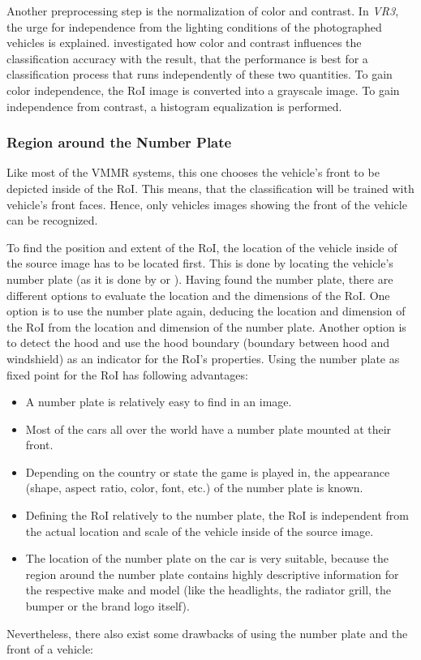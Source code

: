 Another preprocessing step is the normalization of color and contrast. In \emph{VR3}, the urge for independence from the lighting conditions of the photographed vehicles is explained. \citeauthor{petrovic2004analysis} investigated how color and contrast influences the classification accuracy with the result, that the performance is best for a classification process that runs independently of these two quantities. To gain color independence, the RoI image is converted into a grayscale image. To gain independence from contrast, a histogram equalization is performed.

\subsubsection{Region around the Number Plate}\label{sec:regionAroundNumberPlate}
Like most of the VMMR systems, this one chooses the vehicle's front to be depicted inside of the RoI. This means, that the classification will be trained with vehicle's front faces. Hence, only vehicles images showing the front of the vehicle can be recognized.

To find the position and extent of the RoI, the location of the vehicle inside of the source image has to be located first. This is done by locating the vehicle's number plate (as it is done by \citep{petrovic2004analysis} or \citep{siddiqui2015robust}). Having found the number plate, there are different options to evaluate the location and the dimensions of the RoI. One option is to use the number plate again, deducing the location and dimension of the RoI from the location and dimension of the number plate. Another option is to detect the hood and use the hood boundary (boundary between hood and windshield) as an indicator for the RoI's properties. Using the number plate as fixed point for the RoI has following advantages:

\begin{itemize}
  \item A number plate is relatively easy to find in an image. %
  \item Most of the cars all over the world have a number plate mounted at their front.
  \item Depending on the country or state the game is played in, the appearance (shape, aspect ratio, color, font, etc.) of the number plate is known.
  \item Defining the RoI relatively to the number plate, the RoI is independent from the actual location and scale of the vehicle inside of the source image.
  \item The location of the number plate on the car is very suitable, because the region around the number plate contains highly descriptive information for the respective make and model (like the headlights, the radiator grill, the bumper or the brand logo itself).
\end{itemize}
Nevertheless, there also exist some drawbacks of using the number plate and the front of a vehicle:

